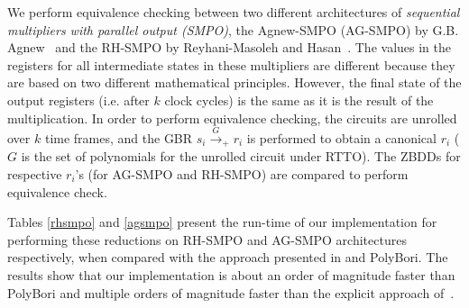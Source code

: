 \par We perform equivalence checking between two different
architectures of {\it sequential multipliers with parallel output
  (SMPO)}, the Agnew-SMPO (AG-SMPO) by
G.B. Agnew~\cite{agnew1991implementation} and the RH-SMPO by
Reyhani-Masoleh and Hasan~\cite{RHmulti}. The values in the registers
for all intermediate states  in these multipliers are different
because they are based on two different mathematical principles.
However, the final state of the output registers (i.e. after $k$ clock
cycles) is the same as it is the result of the multiplication. In
order to perform equivalence checking, the circuits are unrolled
over $k$ time frames, and the GBR $s_i \xrightarrow{G}_+ r_i$ 
is performed to obtain a canonical $r_i$ ($G$ is the set of
polynomials for the unrolled circuit under RTTO). The ZBDDs for
respective $r_i$'s (for AG-SMPO and RH-SMPO) are compared to perform
equivalence check.    


Tables \ref{rhsmpo} and \ref{agsmpo} present the run-time of our
implementation for performing these reductions on RH-SMPO and AG-SMPO
architectures respectively, when compared with the approach presented
in \cite{pruss:tcad} and PolyBori. 
The results show that our implementation is about an order of
magnitude faster than PolyBori and multiple orders of magnitude faster
than the  explicit approach of~\cite{pruss:tcad}.

